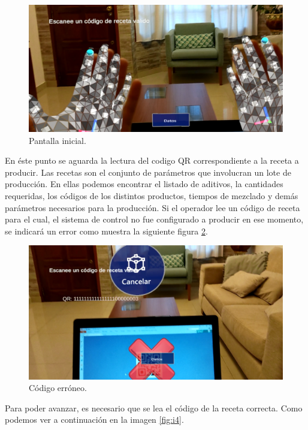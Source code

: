 \begin{figure}[htpb]
	\centering
	\includegraphics[scale=.5]{./Figures/i2.PNG}
	\caption{Pantalla inicial\protect\footnotemark.}
	\label{fig:i2}
\end{figure}

En éste punto se aguarda la lectura del codigo QR correspondiente a la receta a producir. Las recetas son el conjunto de parámetros que involucran un lote de producción. En ellas podemos encontrar el listado de aditivos, la cantidades requeridas, los códigos de los distintos productos, tiempos de mezclado y demás parámetros necesarios para la producción. Si el operador lee un código de receta para el cual, el sistema de control no fue configurado a producir en ese momento, se indicará un error como muestra la siguiente figura \ref{fig:i3}.

\begin{figure}[htpb]
	\centering
	\includegraphics[scale=.4]{./Figures/i3.PNG}
	\caption{Código erróneo\protect\footnotemark.}
	\label{fig:i3}
\end{figure}

Para poder avanzar, es necesario que se lea el código de la receta correcta. Como podemos ver a continuación en la imagen \ref{fig:i4}.
\vspace{60px}

